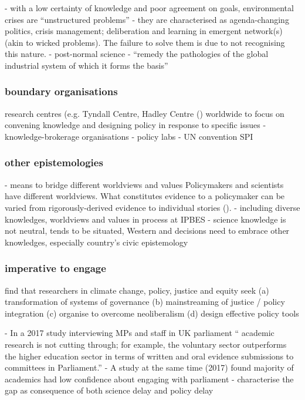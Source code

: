 \cite{WesselinkH2020} - with a low certainty of knowledge and poor agreement on goals, environmental crises are ``unstructured problems'' - they are characterised as agenda-changing politics, crisis management; deliberation and learning in emergent network(s) (akin to \cite{RittelW1973} wicked problems). The failure to solve them is due to not recognising this nature.
\cite[p739]{FuntowiczR1993} - post-normal science - ``remedy the pathologies of the global industrial system of which it forms the basis''

\subsubsection{boundary organisations}
research centres (e.g. Tyndall Centre, Hadley Centre (\cite{WesselinkH2020}) 
worldwide to focus on convening knowledge and designing policy in response to specific issues
\cite{MacKillopCDD2023} - knowledge-brokerage organisations
\cite{OlejniczakBDP2019} - policy labs
\cite{VelanderD2024} - UN convention SPI

\subsubsection{other epistemologies}
\cite{PascualEtAl2018} - means to bridge different worldviews and values
Policymakers and scientists have different worldviews. What constitutes evidence to a policymaker can be varied from rigorously-derived evidence to individual stories (\cite{PiddingtonMD2024}).
\cite{MatukBSAHT2020} - including diverse knowledges, worldviews and values in process at IPBES
\cite{IbarraJOBCIMRS2022} - science knowledge is not neutral, tends to be situated, Western and decisions need to embrace other knowledges, especially country's civic epistemology

\subsubsection{imperative to engage}


\cite{CairneyTS2023} find that researchers in climate change, policy, justice and equity seek (a) transformation of systems of governance (b) mainstreaming of justice / policy integration (c) organise to overcome neoliberalism (d) design effective policy tools

\cite{KennyRHTB2017} - In a 2017 study interviewing MPs and staff in UK parliament `` academic research is not cutting through; for example, the voluntary sector outperforms the higher education sector in terms of written and oral evidence submissions to committees in Parliament.''
\cite{KEU2021perceptions} - A study at the same time (2017) found majority of academics had low confidence about engaging with parliament
\cite{KarlssonG2020} - characterise the gap as consequence of both science delay and policy delay



